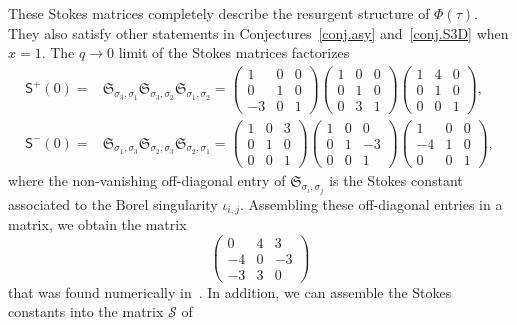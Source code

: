 \documentclass[12pt,reqno]{amsart}
\theoremstyle{definition}
\def\calS{\mathcal S}
\def\s{\sigma}
\def\-{\,-\,}
\def\mfS{\mathfrak{S}}
\def\ms{\mathsf}
\begin{document}
These Stokes matrices completely describe the resurgent structure of
$\Phi(\tau)$.  They also satisfy other statements in
Conjectures~\ref{conj.asy} and~\ref{conj.S3D} when $x=1$. The
$q\rightarrow 0$ limit of the Stokes matrices factorizes
\begin{align}
  \ms{S}^+(0) =
  &\mfS_{\s_3,\s_1}\mfS_{\s_3,\s_2}\mfS_{\s_1,\s_2}
    =
     \begin{pmatrix}
       1&0&0\\0&1&0\\-3&0&1
     \end{pmatrix}
     \begin{pmatrix}
       1&0&0\\0&1&0\\0&3&1
     \end{pmatrix}
     \begin{pmatrix}
      1&4&0\\0&1&0\\0&0&1
    \end{pmatrix},  \label{eq:S0pu052}\\
  \ms{S}^-(0) =
  &\mfS_{\s_1,\s_3}\mfS_{\s_2,\s_3}\mfS_{\s_2,\s_1}
    =
     \begin{pmatrix}
       1&0&3\\0&1&0\\0&0&1
     \end{pmatrix}
     \begin{pmatrix}
       1&0&0\\0&1&-3\\0&0&1
     \end{pmatrix}
     \begin{pmatrix}
      1&0&0\\-4&1&0\\0&0&1
    \end{pmatrix}, \label{eq:S0nu052}
\end{align}
where the non-vanishing off-diagonal entry of $\mfS_{\s_i,\s_j}$ is
the Stokes constant associated to the Borel singularity $\iota_{i,j}$.
Assembling these off-diagonal entries in a matrix, we obtain the matrix
\begin{equation}
\label{GZ52}
\begin{pmatrix}
  0 & 4 & 3 \\ -4 & 0 & -3 \\ -3 & 3 & 0
  \end{pmatrix}
\end{equation}
that was found numerically in~\cite[Sec.3.3]{GZ:kashaev}. In addition,
we can assemble the Stokes constants into the matrix $\calS$ of
\end{document}
